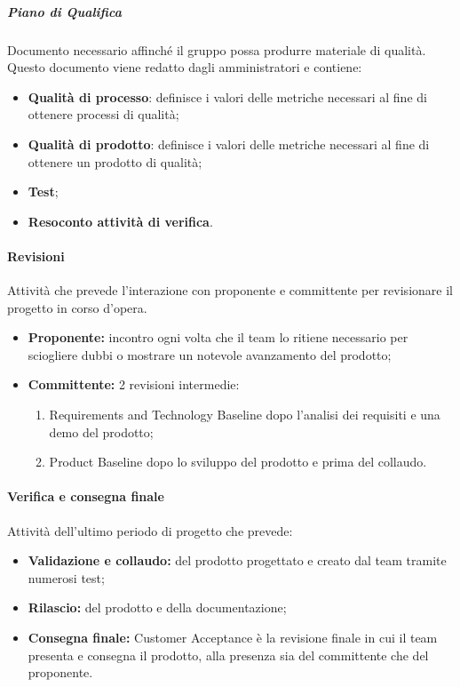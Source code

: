     \subparagraph*{Piano di Qualifica}  \hfill \break
    Documento necessario affinché il gruppo possa produrre materiale di qualità. \\
Questo documento viene redatto dagli amministratori e contiene:
    \begin{itemize}
        \item \textbf{Qualità di processo}: definisce i valori delle metriche necessari al fine di ottenere processi di qualità;
        \item \textbf{Qualità di prodotto}: definisce i valori delle metriche necessari al fine di ottenere un prodotto di qualità;
        \item \textbf{Test};
        \item \textbf{Resoconto attività di verifica}.
    \end{itemize}

  \paragraph{Revisioni} \hfill \break
    Attività che prevede l'interazione con proponente e committente per revisionare il progetto in corso d'opera.
    \begin{itemize}
      \item \textbf{Proponente:} incontro ogni volta che il team lo ritiene necessario per sciogliere dubbi o mostrare un notevole avanzamento del prodotto;
      \item \textbf{Committente:} 2 revisioni intermedie:
            \begin{enumerate}
              \item Requirements and Technology Baseline dopo l'analisi dei requisiti e una demo del prodotto;
              \item Product Baseline dopo lo sviluppo del prodotto e prima del collaudo.
            \end{enumerate}          
    \end{itemize}
    \paragraph{Verifica e consegna finale} \hfill \break
    Attività dell'ultimo periodo di progetto che prevede: 
    \begin{itemize}
      \item \textbf{Validazione e collaudo:} del prodotto progettato e creato dal team tramite numerosi test;
      \item \textbf{Rilascio:} del prodotto e della documentazione;
      \item \textbf{Consegna finale:} Customer Acceptance è la revisione finale in cui il team presenta e consegna il prodotto, alla presenza sia del committente che del proponente.
    \end{itemize}
    
